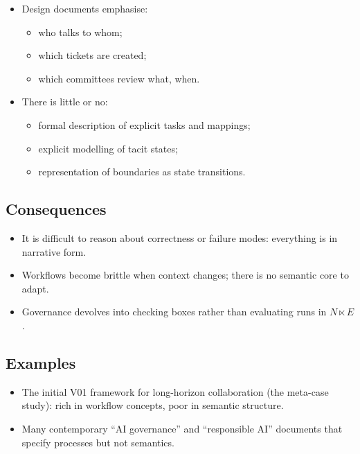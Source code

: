 \begin{itemize}
  \item Design documents emphasise:
        \begin{itemize}
          \item who talks to whom;
          \item which tickets are created;
          \item which committees review what, when.
        \end{itemize}
  \item There is little or no:
        \begin{itemize}
          \item formal description of explicit tasks and mappings;
          \item explicit modelling of tacit states;
          \item representation of boundaries as state transitions.
        \end{itemize}
\end{itemize}

\subsection*{Consequences}

\begin{itemize}
  \item It is difficult to reason about correctness or failure modes:
        everything is in narrative form.
  \item Workflows become brittle when context changes; there is no
        semantic core to adapt.
  \item Governance devolves into checking boxes rather than evaluating
        runs in \(N \ltimes E\).
\end{itemize}

\subsection*{Examples}

\begin{itemize}
  \item The initial V01 framework for long-horizon collaboration (the
        meta-case study):
        rich in workflow concepts, poor in semantic structure.
  \item Many contemporary ``AI governance'' and ``responsible AI''
        documents that specify processes but not semantics.
\end{itemize}

